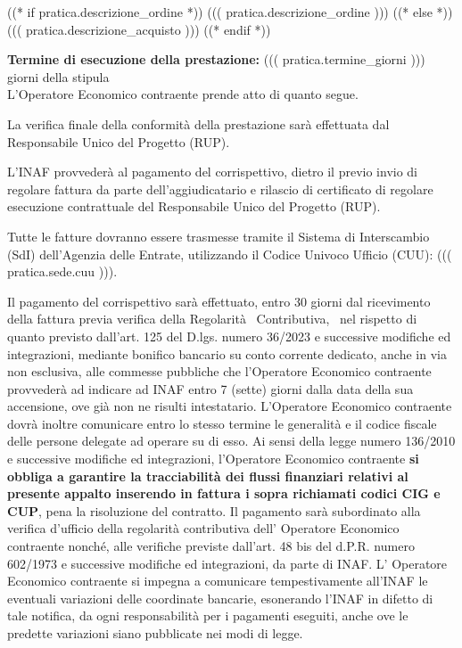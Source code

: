 
((* if pratica.descrizione_ordine *))
((( pratica.descrizione_ordine )))
((* else *))
((( pratica.descrizione_acquisto )))
((* endif *))



\textbf{Termine di esecuzione della prestazione:} ((( pratica.termine_giorni ))) giorni della stipula \\

L'Operatore Economico contraente prende atto di quanto segue.

La verifica finale della conformità della prestazione sarà effettuata
dal Responsabile Unico del Progetto (RUP).

L'INAF provvederà al pagamento del corrispettivo, dietro il previo
invio di regolare fattura da parte dell'aggiudicatario e rilascio di
certificato di regolare esecuzione contrattuale del Responsabile Unico
del Progetto (RUP).

Tutte le fatture dovranno essere trasmesse tramite il Sistema di
Interscambio (SdI) dell'Agenzia delle Entrate, utilizzando il Codice
Univoco Ufficio (CUU): ((( pratica.sede.cuu ))).

Il pagamento del corrispettivo sarà effettuato, entro 30 giorni dal
ricevimento della fattura previa verifica della Regolarità  Contributiva,  nel
rispetto di quanto previsto dall'art. 125 del D.lgs. numero 36/2023 e
successive modifiche ed integrazioni, mediante bonifico bancario su conto
corrente dedicato, anche in via non esclusiva, alle commesse pubbliche che
l'Operatore Economico contraente provvederà ad indicare ad INAF entro 7
(sette) giorni dalla data della sua accensione, ove già non ne risulti
intestatario. L'Operatore Economico contraente dovrà inoltre comunicare
entro lo stesso termine le generalità e il codice fiscale delle persone
delegate ad operare su di esso. Ai sensi della legge numero 136/2010 e
successive modifiche ed integrazioni, l'Operatore Economico contraente
\textbf{si obbliga a garantire la tracciabilità dei flussi finanziari relativi al
presente appalto inserendo in fattura i sopra richiamati codici CIG e CUP},
pena la risoluzione del contratto. Il pagamento sarà subordinato alla
verifica d'ufficio della regolarità contributiva dell' Operatore
Economico contraente nonché, alle verifiche previste dall'art. 48
bis del d.P.R. numero 602/1973 e successive modifiche ed integrazioni,
da parte di INAF. L' Operatore Economico contraente si impegna a
comunicare tempestivamente all'INAF le eventuali variazioni delle
coordinate bancarie, esonerando l'INAF in difetto di tale notifica,
da ogni responsabilità per i pagamenti eseguiti, anche ove le predette
variazioni siano pubblicate nei modi di legge.



